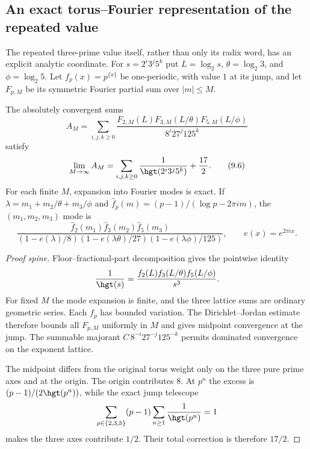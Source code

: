 
\subsection{An exact torus--Fourier representation of the repeated value}

The repeated three-prime value itself, rather than only its radix word, has
an explicit analytic coordinate.  For $s=2^i3^j5^k$ put
$L=\log_2s$, $\theta=\log_2 3$, and $\phi=\log_2 5$.  Let
$f_p(x)=p^{\{x\}}$ be one-periodic, with value $1$ at its jump, and let
$F_{p,M}$ be its symmetric Fourier partial sum over $|m|\le M$.

\begin{theorem}
\label{res:torus-fourier-value}
The absolutely convergent sums
\[
 A_M=\sum_{i,j,k\ge0}
 \frac{F_{2,M}(L)F_{3,M}(L/\theta)F_{5,M}(L/\phi)}
      {8^i27^j125^k}
\]
satisfy
\[
 \lim_{M\to\infty}A_M
 =\sum_{i,j,k\ge0}\frac1{\hgt(2^i3^j5^k)}+\frac{17}{2}.
 \tag{9.6}\label{eq:torus-fourier-value}
\]
For each finite $M$, expansion into Fourier modes is exact.  If
$\lambda=m_1+m_2/\theta+m_3/\phi$ and
$\widehat f_p(m)=(p-1)/(\log p-2\pi i m)$, the $(m_1,m_2,m_3)$ mode is
\[
 \frac{\widehat f_2(m_1)\widehat f_3(m_2)\widehat f_5(m_3)}
 {(1-e(\lambda)/8)(1-e(\lambda\theta)/27)
  (1-e(\lambda\phi)/125)},
 \qquad e(x)=e^{2\pi i x}.
\]
\end{theorem}

\begin{proof}[Proof spine]
Floor--fractional-part decomposition gives the pointwise identity
\[
 \frac1{\hgt(s)}=
 \frac{f_2(L)f_3(L/\theta)f_5(L/\phi)}{s^3}.
\]
For fixed $M$ the mode expansion is finite, and the three lattice sums are
ordinary geometric series.  Each $f_p$ has bounded variation.  The
Dirichlet--Jordan estimate therefore bounds all $F_{p,M}$ uniformly in $M$
and gives midpoint convergence at the jump.  The summable majorant
$C\,8^{-i}27^{-j}125^{-k}$ permits dominated convergence on the exponent
lattice.

The midpoint differs from the original torus weight only on the three pure
prime axes and at the origin.  The origin contributes $8$.  At $p^n$ the
excess is $(p-1)/(2\hgt(p^n))$, while the exact jump telescope
\[
 \sum_{p\in\{2,3,5\}}(p-1)
       \sum_{n\ge1}\frac1{\hgt(p^n)}=1
\]
makes the three axes contribute $1/2$.  Their total correction is therefore
$17/2$.
\end{proof}

